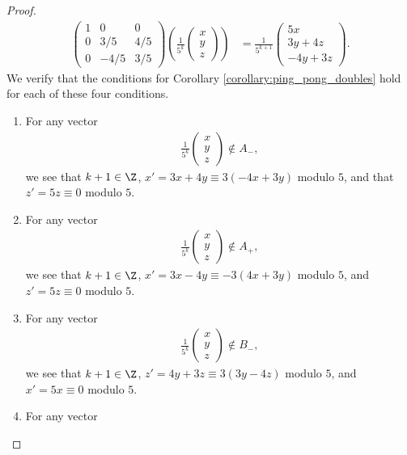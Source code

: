 \begin{proof}
\begin{align*}
    \begin{pmatrix}1 & 0 & 0 \\ 0 & 3/5 & 4/5 \\ 0 & -4/5 & 3/5\end{pmatrix} \left(\frac{1}{5^{k}} \begin{pmatrix}x\\y\\z\end{pmatrix}\right) &= \frac{1}{5^{k+1}} \begin{pmatrix}5x \\ 3y + 4z \\ -4y + 3z\end{pmatrix}.\tag*{(4)}
  \end{align*}
  We verify that the conditions for Corollary \ref{corollary:ping_pong_doubles} hold for each of these four conditions.
  \begin{enumerate}[(1)]
    \item For any vector
      \begin{align*}
        \frac{1}{5^{k}} \begin{pmatrix}x\\y\\z\end{pmatrix} \notin A_{-},
      \end{align*}
      we see that $k+1\in \Z$, $x' = 3x + 4y \equiv 3\left(-4x + 3y\right)$  modulo $5$, and that $z' = 5z\equiv 0$ modulo $5$.
    \item For any vector
      \begin{align*}
        \frac{1}{5^{k}} \begin{pmatrix}x\\y\\z\end{pmatrix} \notin A_{+},
      \end{align*}
      we see that $k+1\in \Z$, $x' = 3x - 4y\equiv -3\left(4x + 3y\right)$ modulo $5$, and $z' = 5z \equiv 0$ modulo $5$.
    \item For any vector
      \begin{align*}
        \frac{1}{5^{k}} \begin{pmatrix}x\\y\\z\end{pmatrix}\notin B_{-},
      \end{align*}
      we see that $k+1\in \Z$, $z' = 4y + 3z \equiv 3\left(3y-4z\right)$ modulo $5$, and $x' = 5x\equiv 0$ modulo $5$.
    \item For any vector

\end{enumerate}
\end{proof}

